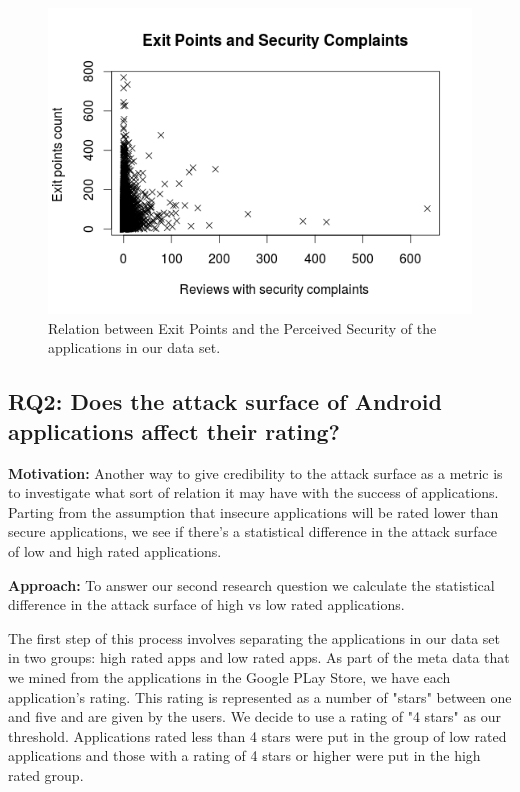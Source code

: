 \documentclass{sig-alternate}
\begin{document}
\begin{figure}
  \centering
  \includegraphics[scale=0.50]{figs/exit_points_sec_complaints.png}
  \caption{Relation between Exit Points and the Perceived Security of the applications in our data set.}  
  \label{fig:exitpoints_seccomplaints}
\end{figure}

\subsection{RQ2: Does the attack surface of Android applications affect their rating?}

\textbf{Motivation:} Another way to give credibility to the attack surface as a metric is to investigate what sort of relation it may have with the success of applications. Parting from the assumption that insecure applications will be rated lower than secure applications, we see if there's a statistical difference in the attack surface of low and high rated applications.

\textbf{Approach:} To answer our second research question we calculate the statistical difference in the attack surface of high vs low rated applications.

The first step of this process involves separating the applications in our data set in two groups: high rated apps and low rated apps. As part of the meta data that we mined from the applications in the Google PLay Store, we have each application's rating. This rating is represented as a number of "stars" between one and five and are given by the users. We decide to use a rating of "4 stars" as our threshold. Applications rated less than 4 stars were put in the group of low rated applications and those with a rating of 4 stars or higher were put in the high rated group.
\end{document}

